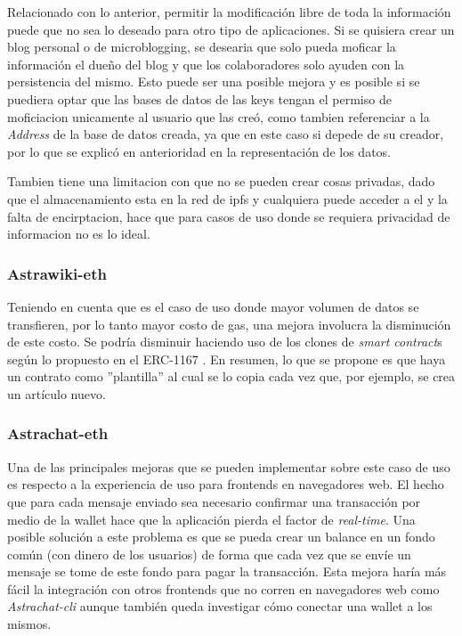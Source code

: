 Relacionado con lo anterior, permitir la modificación libre de toda la información puede que no sea lo deseado para otro tipo de aplicaciones. Si se quisiera crear un blog personal o de microblogging, se desearia que solo  pueda moficar la información el dueño del blog y que los colaboradores solo ayuden con la persistencia del mismo. Esto puede ser una posible mejora y es posible si se puediera optar que las bases de datos de las keys tengan el permiso de moficiacion unicamente al usuario que las creó, como tambien referenciar a la \textit{Address} de la base de datos creada, ya que en este caso si depede de su creador, por lo que se explicó en anterioridad en la representación de los datos.

Tambien tiene una limitacion con que no se pueden crear cosas privadas, dado que el almacenamiento esta en la red de ipfs y cualquiera puede acceder a el y la falta de encirptacion, hace que para casos de uso donde se requiera privacidad de informacion no es lo ideal.

\subsubsection{Astrawiki-eth}

Teniendo en cuenta que es el caso de uso donde mayor volumen de datos se transfieren, por lo tanto mayor costo de gas, una mejora involucra la disminución de este costo. Se podría disminuir haciendo uso de los clones de \textit{smart contract}s según lo propuesto en el ERC-1167 \cite{erc-1167}. En resumen, lo que se propone es que haya un contrato como ''plantilla'' al cual se lo copia cada vez que, por ejemplo, se crea un artículo nuevo.

\subsubsection{Astrachat-eth}

Una de las principales mejoras que se pueden implementar sobre este caso de uso es respecto a la experiencia de uso para frontends en navegadores web. El hecho que para cada mensaje enviado sea necesario confirmar una transacción por medio de la wallet hace que la aplicación pierda el factor de \textit{real-time}. Una posible solución a este problema es que se pueda crear un balance en un fondo común (con dinero de los usuarios) de forma que cada vez que se envíe un mensaje se tome de este fondo para pagar la transacción. Esta mejora haría más fácil la integración con otros frontends que no corren en navegadores web como \textit{Astrachat-cli} aunque también queda investigar cómo conectar una wallet a los mismos.

